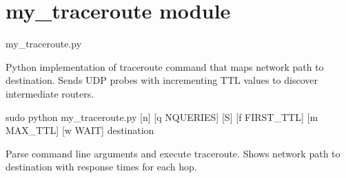 \documentclass[letterpaper,10pt,english]{sphinxmanual}
\begin{document}
\sphinxstepscope


\chapter{my\_traceroute module}
\label{\detokenize{my_traceroute:module-my_traceroute}}\label{\detokenize{my_traceroute:my-traceroute-module}}\label{\detokenize{my_traceroute::doc}}
\sphinxAtStartPar
my\_traceroute.py

\sphinxAtStartPar
Python implementation of traceroute command that maps network path to destination.
Sends UDP probes with incrementing TTL values to discover intermediate routers.
\begin{description}
\sphinxAtStartPar
sudo python my\_traceroute.py {[}\sphinxhyphen{}n{]} {[}\sphinxhyphen{}q NQUERIES{]} {[}\sphinxhyphen{}S{]} {[}\sphinxhyphen{}f FIRST\_TTL{]} {[}\sphinxhyphen{}m MAX\_TTL{]} {[}\sphinxhyphen{}w WAIT{]} destination

\end{description}

\begin{fulllineitems}
\label{\detokenize{my_traceroute:my_traceroute.main}}
\pysigstartsignatures
\pysiglinewithargsret
{}
{}
{}
\pysigstopsignatures
\sphinxAtStartPar
Parse command line arguments and execute traceroute.
Shows network path to destination with response times for each hop.

\end{fulllineitems}

\end{document}
